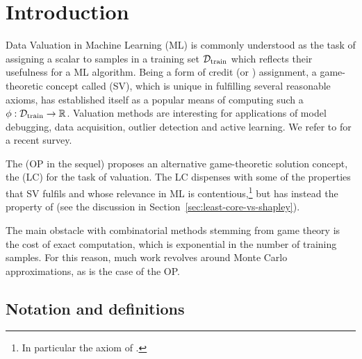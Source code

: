 \section{Introduction}

Data Valuation in Machine Learning (ML) is commonly understood as the task of
assigning a scalar  to samples in a training set
$\mathcal{D}_{\operatorname{train}}$ which reflects their usefulness for a ML
algorithm. Being a form of credit (or ) assignment, a
game-theoretic concept called  (SV), which is unique
in fulfilling several reasonable axioms, has established itself as a popular
means of computing such a  $\phi :
\mathcal{D}_{\operatorname{train}} \rightarrow \mathbb{R}$. Valuation methods are
interesting for applications of model debugging, data acquisition, outlier
detection and active learning. We refer to {\cite{sim_data_2022}} for a recent
survey.

The {} {\cite{yan_if_2021}} (OP in the sequel) proposes
an alternative game-theoretic solution concept, the {} (LC)
for the task of valuation. The LC dispenses with some of the properties that
SV fulfils and whose relevance in ML is contentious,\footnote{In particular
the axiom of {}.} but has instead the property of
{} (see the discussion in
Section~\ref{sec:least-core-vs-shapley}).

The main obstacle with combinatorial methods stemming from game theory is the
cost of exact computation, which is exponential in the number of training
samples. For this reason, much work revolves around Monte Carlo
approximations, as is the case of the OP.

\subsection{Notation and definitions}

